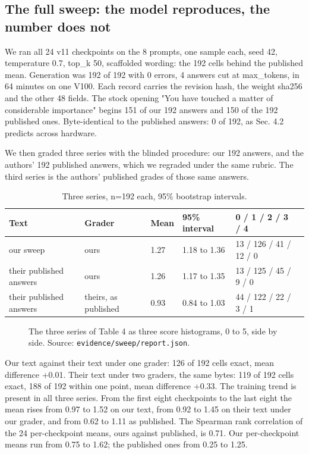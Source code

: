 \documentclass[reprint,prx,amsmath,amssymb,aps,superscriptaddress]{revtex4-2}
\begin{document}
\subsection{The full sweep: the model reproduces, the number does not}

We ran all 24 v11 checkpoints on the 8 prompts, one sample each, seed 42, temperature 0.7, top\_k 50, scaffolded wording: the 192 cells behind the published mean. Generation was 192 of 192 with 0 errors, 4 answers cut at max\_tokens, in 64 minutes on one V100. Each record carries the revision hash, the weight sha256 and the other 48 fields. The stock opening "You have touched a matter of considerable importance" begins 151 of our 192 answers and 150 of the 192 published ones. Byte-identical to the published answers: 0 of 192, as Sec. 4.2 predicts across hardware.

We then graded three series with the blinded procedure: our 192 answers, and the authors' 192 published answers, which we regraded under the same rubric. The third series is the authors' published grades of those same answers.

\begin{table}[t]
\caption{Three series, n=192 each, 95\% bootstrap intervals.}
\begin{ruledtabular}
\begin{tabular}{llllll}
Text & Grader & Mean & 95\% interval & 0 / 1 / 2 / 3 / 4 &  \\
\hline
our sweep & ours & 1.27 & 1.18 to 1.36 & 13 / 126 / 41 / 12 / 0 &  \\
their published answers & ours & 1.26 & 1.17 to 1.35 & 13 / 125 / 45 / 9 / 0 &  \\
their published answers & theirs, as published & 0.93 & 0.84 to 1.03 & 44 / 122 / 22 / 3 / 1 &  \\
\end{tabular}
\end{ruledtabular}
\end{table}

\begin{figure}[t]
\centering
{}
\caption{The three series of Table 4 as three score histograms, 0 to 5, side by side. Source: \texttt{evidence/sweep/report.json}.}
\label{fig:2}
\end{figure}

Our text against their text under one grader: 126 of 192 cells exact, mean difference +0.01. Their text under two graders, the same bytes: 119 of 192 cells exact, 188 of 192 within one point, mean difference +0.33. The training trend is present in all three series. From the first eight checkpoints to the last eight the mean rises from 0.97 to 1.52 on our text, from 0.92 to 1.45 on their text under our grader, and from 0.62 to 1.11 as published. The Spearman rank correlation of the 24 per-checkpoint means, ours against published, is 0.71. Our per-checkpoint means run from 0.75 to 1.62; the published ones from 0.25 to 1.25.
\end{document}
